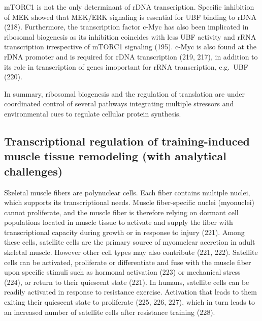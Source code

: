 \documentclass[twoside,10pt]{gihclass} %
\begin{document}
mTORC1 is not the only determinant of rDNA transcription. Specific inhibition of MEK showed that MEK/ERK signaling is essential for UBF binding to rDNA
(218).
Furthermore, the transcription factor c-Myc has also been implicated in ribosomal biogenesis as its inhibition coincides with less UBF activity and rRNA transcription irrespective of mTORC1 signaling
(195).
c-Myc is also found at the rDNA promoter and is required for rDNA transcription
(219, 217),
in addition to its role in transcription of genes imoportant for rRNA transcription, e.g.~UBF
(220).

In summary, ribosomal biogenesis and the regulation of translation are under coordinated control of several pathways integrating multiple stressors and environmental cues to regulate cellular protein synthesis.

\hypertarget{transcriptional-regulation-of-training-induced-muscle-tissue-remodeling-with-analytical-challenges}{%
\subsection{Transcriptional regulation of training-induced muscle tissue remodeling (with analytical challenges)}\label{transcriptional-regulation-of-training-induced-muscle-tissue-remodeling-with-analytical-challenges}}

Skeletal muscle fibers are polynuclear cells. Each fiber contains multiple nuclei, which supports its transcriptional needs. Muscle fiber-specific nuclei (myonuclei) cannot proliferate, and the muscle fiber is therefore relying on dormant cell populations located in muscle tissue to activate and supply the fiber with transcriptional capacity during growth or in response to injury
(221).
Among these cells, satellite cells are the primary source of myonuclear accretion in adult skeletal muscle.
However other cell types may also contribute
(221, 222).
Satellite cells can be activated, proliferate or differentiate and fuse with the muscle fiber upon specific stimuli such as hormonal activation
(223)
or mechanical stress
(224),
or return to their quiescent state
(221).
In humans, satellite cells can be readily activated in response to resistance exercise. Activation that leads to them exiting their quiescent state to proliferate
(225, 226, 227),
which in turn leads to an increased number of satellite cells after resistance training
(228).
\end{document}
